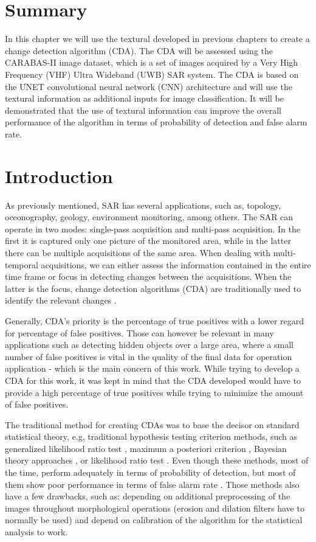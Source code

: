 \section{Summary}
In this chapter we will use the textural developed in previous chapters 
to create a change detection algorithm (CDA). The CDA will be assessed
using the CARABAS-II image dataset, which is a set of images acquired by a Very High Frequency (VHF) Ultra Wideband (UWB) SAR system.
The CDA is based on the UNET convolutional neural network (CNN) architecture and will use the 
textural information as additional inputs for image classification.
It will be demonstrated that the 
use of textural information can improve the overall performance of the algorithm
in terms of probability of detection and false alarm rate. 

\section{Introduction}
As previously mentioned, SAR has several applications, such as, topology, oceonography, geology, environment monitoring, among others.
The SAR can operate in two modes: single-pass acquisition and multi-pass acquisition. In the first it is captured only one picture of the 
monitored area, while in the latter there can be multiple acquisitions of the same area. 
When dealing with multi-temporal acquisitions, we can either assess the information contained in the entire time frame or focus in detecting changes between the acquisitions. 
When the latter is the focus, change detection algorithms (CDA) are traditionally used to identify the relevant changes \cite{Carabas, Ricardo}.

Generally, CDA's priority is the percentage of true positives with a lower regard for percentage of false positives. 
Those can however be relevant in many applications such as detecting hidden objects over a large area, 
where a small number of false positives is vital in the quality of the final data for operation application - which is the main concern of this work. 
While trying to develop a CDA for this work, it was kept in mind that the CDA developed would have to provide a high percentage of true positives while trying to minimize
the amount of false positives.

The traditional method for creating CDAs was to base the decisor on standard statistical theory, e.g, traditional hypothesis testing criterion methods,
such as 
generalized likelihood ratio test \cite{GLRT1,GLRT2,GLRT3}, 
maximum a posteriori criterion \cite{Book_Kay},
Bayesian theory approaches \cite{Bayes1, Bayes2},
or likelihood ratio test \cite{LRT1,LRT2,LRT3}. Even though these methods, most of the time, perform adequately in terms of probability of detection, but
most of them show poor performance in terms of false alarm rate \cite{Carabas,Ricardo,LucasRamos,Chris}. Those methods also have a few drawbacks, such as: depending on
additional preprocessing of the images throughout morphological operations (erosion and dilation filters have to normally be used) and depend on calibration of the algorithm
for the statistical analysis to work.

